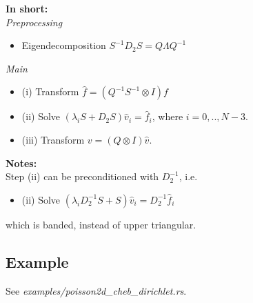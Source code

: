 \documentclass[10pt,a4paper]{article}
\begin{document}
\textbf{In short:}\\

\textit{Preprocessing}
\begin{itemize}
\item Eigendecomposition $S^{-1} D_2 S = Q \Lambda Q^{-1}$
\end{itemize}

\textit{Main}
\begin{itemize}
\item (i) Transform $\widehat{f} = (Q^{-1} S^{-1} \otimes I)f$
\item (ii) Solve $(\lambda_i  S +  D_2 S) \widehat{v}_i = \widehat{f}_i$, where $i=0,..,N-3$.
\item (iii) Transform $v = (Q \otimes I) \widehat{v}$.
\end{itemize}

\textbf{Notes:}\\

Step (ii) can be preconditioned with $D_2^{-1}$, i.e.
\begin{itemize}
\item (ii) Solve $(\lambda_i  D_2^{-1}S +  S) \widehat{v}_i = D_2^{-1}\widehat{f}_i$
\end{itemize}

which is banded, instead of upper triangular.

\subsection*{Example}
See \textit{examples/poisson2d\_cheb\_dirichlet.rs}.

%
\end{document}
